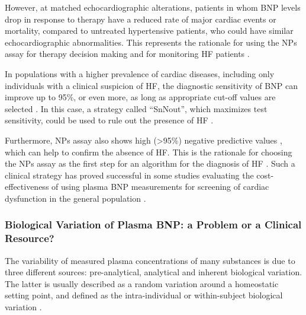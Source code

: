 \documentclass[14pt,a4paper,onecolumn]{extarticle}
\begin{document}
However, at matched echocardiographic alterations, patients in whom BNP levels drop in response to therapy have a reduced rate of major cardiac events or mortality, compared to untreated hypertensive patients, who could have similar echocardiographic abnormalities. This represents the rationale for using the NPs assay for therapy decision making and for monitoring HF patients \citep{bib35} \citep{bib363} \citep{bib364}.



In populations with a higher prevalence of cardiac diseases, including only individuals with a clinical suspicion of HF, the diagnostic sensitivity of BNP can improve up to 95\%, or even more, as long as appropriate cut-off values are selected \citep{bib35} \citep{bib372}. In this case, a strategy called “SnNout”, which maximizes test sensitivity, could be used to rule out the presence of HF \citep{bib391}.



Furthermore, NPs assay also shows high (>95\%) negative predictive values \citep{bib35} \citep{bib320}, which can help to confirm the absence of HF. This is the rationale for choosing the NPs assay as the first step for an algorithm for the diagnosis of HF \citep{bib369} \citep{bib370}. Such a clinical strategy has proved successful in some  studies evaluating the cost-effectiveness of using plasma BNP measurements for screening of cardiac dysfunction in the general population \citep{bib392} \citep{bib393} \citep{bib3171}.





\subsubsection{ Biological Variation of Plasma BNP: a Problem or a Clinical Resource?}



The variability of measured plasma concentrations of many substances is due to three different sources: pre-analytical, analytical and inherent biological variation. The latter is usually described as a random variation around a homeostatic setting point, and defined as the intra-individual or within-subject biological variation \citep{bib395}.



\end{document}

